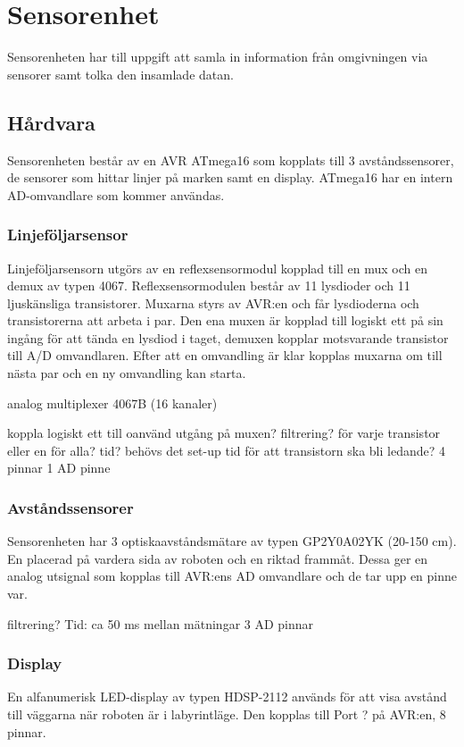 \section{Sensorenhet}
Sensorenheten har till uppgift att samla in information från omgivningen via sensorer samt tolka den insamlade datan. 

\subsection{Hårdvara}
Sensorenheten består av en AVR ATmega16 som kopplats till 3 avståndssensorer, de sensorer som hittar linjer på marken samt en display. ATmega16 har en intern AD-omvandlare som kommer användas.

\subsubsection{Linjeföljarsensor}
Linjeföljarsensorn utgörs av en reflexsensormodul kopplad till en mux och en demux av typen 4067. Reflexsensormodulen består av 11 lysdioder och 11 ljuskänsliga transistorer.  Muxarna styrs av AVR:en och får lysdioderna och transistorerna att arbeta i par. Den ena muxen är kopplad till logiskt ett på sin ingång för att tända en lysdiod i taget, demuxen kopplar motsvarande transistor till A/D omvandlaren. Efter att en omvandling är klar kopplas muxarna om till nästa par och en ny omvandling kan starta.

analog multiplexer 4067B (16 kanaler)

koppla logiskt ett till oanvänd utgång på muxen?
filtrering? för varje transistor eller en för alla?
tid? behövs det set-up tid för att transistorn ska bli ledande?
4 pinnar
1 AD pinne

\subsubsection{Avståndssensorer}
Sensorenheten har 3 optiskaavståndsmätare av typen GP2Y0A02YK (20-150 cm). En placerad på vardera sida av roboten och en riktad frammåt. Dessa ger en analog utsignal som kopplas till AVR:ens AD omvandlare och de tar upp en pinne var.

filtrering?
Tid: ca 50 ms mellan mätningar
3 AD pinnar

\subsubsection{Display}
En alfanumerisk LED-display av typen HDSP-2112 används för att visa avstånd till väggarna när roboten är i labyrintläge. Den kopplas till Port ? på AVR:en, 8 pinnar.

